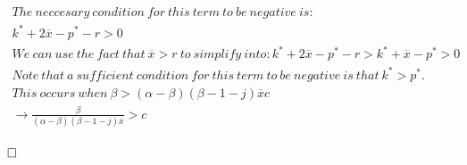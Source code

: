 \documentclass{article}
\begin{document}
\[\begin{array}{ll}
The~neccesary~condition~for~this~term~to~be~negative~is:  \\
k^* + 2 \overline{x} -p^* -r >0 \\
We~can~use~the~fact~that~\overline{x}>r~to~simplify~into: 
k^* + 2 \overline{x} -p^* -r >k^* + \overline{x} -p^*>0 \\
Note~that~a~sufficient~condition~for~this~term~to~be~negative~is~that~k^*>p^*. \\
This~occurs~when~\beta > (\alpha-\beta)(\beta-1-j)\overline{x}c \\

\rightarrow  \frac{\beta}{(\alpha-\beta)(\beta-1-j)\overline{x}} > c \\

\end{array}
\]

$\hfill \square$
\end{document}
